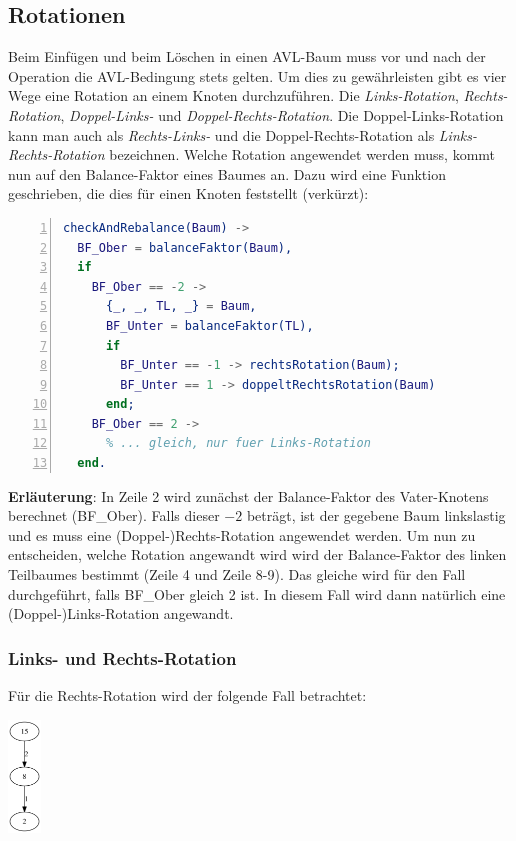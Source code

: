 \documentclass{article}
\begin{document}
	\subsection{Rotationen}
	
	Beim Einfügen und beim Löschen in einen AVL-Baum muss vor und nach der Operation die AVL-Bedingung stets gelten. Um dies zu gewährleisten gibt es vier Wege eine Rotation an einem Knoten durchzuführen. Die \textit{Links-Rotation}, \textit{Rechts-Rotation}, \textit{Doppel-Links-} und \textit{Doppel-Rechts-Rotation}. Die Doppel-Links-Rotation kann man auch als \textit{Rechts-Links-} und die Doppel-Rechts-Rotation als \textit{Links-Rechts-Rotation} bezeichnen. 
	Welche Rotation angewendet werden muss, kommt nun auf den Balance-Faktor eines Baumes an. Dazu wird eine Funktion geschrieben, die dies für einen Knoten feststellt (verkürzt):
	
	\begin{lstlisting}[language=erlang,numbers=left]
checkAndRebalance(Baum) ->
  BF_Ober = balanceFaktor(Baum),
  if
    BF_Ober == -2 ->
	  {_, _, TL, _} = Baum,
	  BF_Unter = balanceFaktor(TL),
	  if
	    BF_Unter == -1 -> rechtsRotation(Baum);
	    BF_Unter == 1 -> doppeltRechtsRotation(Baum)
	  end;
	BF_Ober == 2 ->
	  % ... gleich, nur fuer Links-Rotation
  end.	
	\end{lstlisting}

	\textbf{Erläuterung}: In Zeile 2 wird zunächst der Balance-Faktor des Vater-Knotens berechnet (BF\_Ober). Falls dieser $-2$ beträgt, ist der gegebene Baum linkslastig und es muss eine (Doppel-)Rechts-Rotation angewendet werden. Um nun zu entscheiden, welche Rotation angewandt wird wird der Balance-Faktor des linken Teilbaumes bestimmt (Zeile 4 und Zeile 8-9).
	Das gleiche wird für den Fall durchgeführt, falls BF\_Ober gleich 2 ist. In diesem Fall wird dann natürlich eine (Doppel-)Links-Rotation angewandt.
	
	\subsubsection{Links- und Rechts-Rotation}
	
	Für die Rechts-Rotation wird der folgende Fall betrachtet:
	
	\begin{center}
   	\includegraphics[height=3cm]{2.png}
	\end{center}
	
\end{document}
